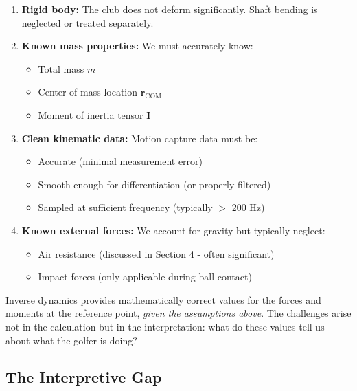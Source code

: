 \documentclass[11pt,a4paper]{article}
\newcommand{\bvec}[1]{\mathbf{#1}}
\theoremstyle{definition}
\theoremstyle{plain}
\begin{document}
\begin{enumerate}
    \item \textbf{Rigid body:} The club does not deform significantly. Shaft bending is neglected or treated separately.
    
    \item \textbf{Known mass properties:} We must accurately know:
    \begin{itemize}
        \item Total mass $m$
        \item Center of mass location $\bvec{r}_{\text{COM}}$
        \item Moment of inertia tensor $\bvec{I}$
    \end{itemize}
    
    \item \textbf{Clean kinematic data:} Motion capture data must be:
    \begin{itemize}
        \item Accurate (minimal measurement error)
        \item Smooth enough for differentiation (or properly filtered)
        \item Sampled at sufficient frequency (typically $>$ 200 Hz)
    \end{itemize}
    
    \item \textbf{Known external forces:} We account for gravity but typically neglect:
    \begin{itemize}
        \item Air resistance (discussed in Section 4 - often significant)
        \item Impact forces (only applicable during ball contact)
    \end{itemize}
\end{enumerate}

\begin{keypoint}
Inverse dynamics provides mathematically correct values for the forces and moments at the reference point, \emph{given the assumptions above}. The challenges arise not in the calculation but in the interpretation: what do these values tell us about what the golfer is doing?
\end{keypoint}

\subsection{The Interpretive Gap}
\end{document}
